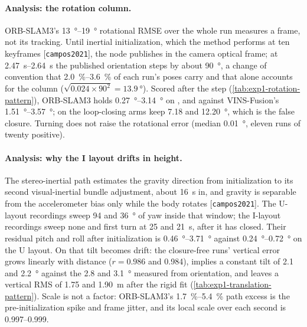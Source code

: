 \documentclass[11pt,a4paper,notitlepage]{report}
\renewcommand{\cite}[1]{[\texttt{#1}]}
\begin{document}
\paragraph{Analysis: the rotation column.} ORB-SLAM3's
\SIrange{13}{19}{\degree} rotational RMSE over the whole run measures a frame,
not its tracking. Until inertial initialization, which the method performs at
ten keyframes \cite{campos2021}, the node publishes in the camera optical
frame; at \SIrange{2.47}{2.64}{\second} the published orientation steps by
about \SI{90}{\degree}, a change of convention that \SIrange{2.0}{3.6}{\percent}
of each run's poses carry and that alone accounts for the column
($\sqrt{0.024 \times 90^2} = \SI{13.9}{\degree}$). Scored after the step
(\cref{tab:exp1-rotation-pattern}), ORB-SLAM3 holds
\SIrange{0.27}{3.14}{\degree} on ,  and
 against VINS-Fusion's \SIrange{1.51}{3.57}{\degree}; on
 the loop-closing arms keep \SI{7.18}{} and
\SI{12.20}{\degree}, which is the false closure. Turning does not raise the
rotational error (median \SI[retain-explicit-plus]{+0.01}{\degree}, eleven runs
of twenty positive).


\paragraph{Analysis: why the I layout drifts in height.} The stereo-inertial
path estimates the gravity direction from initialization to its second
visual-inertial bundle adjustment, about \SI{16}{\second} in, and gravity is
separable from the accelerometer bias only while the body rotates
\cite{campos2021}. The U-layout recordings sweep \SI{94}{} and
\SI{36}{\degree} of yaw inside that window; the I-layout recordings sweep none
and first turn at \SI{25}{} and \SI{21}{\second}, after it has closed. Their
residual pitch and roll after initialization is \SIrange{0.46}{3.71}{\degree}
against \SIrange{0.24}{0.72}{\degree} on the U layout. On
 that tilt becomes drift: the closure-free runs' vertical
error grows linearly with distance ($r = \num{0.986}$ and \num{0.984}), implies
a constant tilt of \SI{2.1}{} and \SI{2.2}{\degree} against the \SI{2.8}{} and
\SI{3.1}{\degree} measured from orientation, and leaves a vertical RMS of
\SI{1.75}{} and \SI{1.90}{\metre} after the rigid fit
(\cref{tab:exp1-translation-pattern}).  Scale is not a factor: ORB-SLAM3's
\SIrange{1.7}{5.4}{\percent} path excess is the pre-initialization spike and
frame jitter, and its local scale over each second is
\numrange{0.997}{0.999}.
\end{document}
